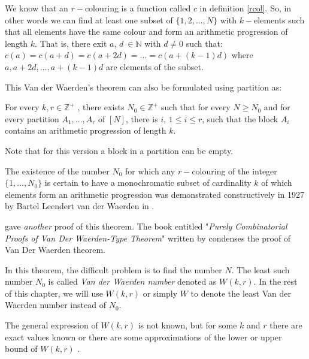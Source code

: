 
We know that an $r-$colouring is a function called $c$ in definition \eqref{rcol}. So, in other words we can find at least one subset of $\{1,2,\ldots,N\}$ with $k-$elements such that all elements have the same colour and form an arithmetic progression of length $k$. That is, there exit
$a$,  $d \ \in \mathbb{N}$ with $d\neq 0$ such that: $c(a)=c(a+d)=c(a+2d)=\ldots =c(a+(k-1)d)$ where $a, a+2d, \ldots, a+(k-1)d$ are elements of the subset.

This Van der Waerden's theorem can also be formulated using partition \citep{dransfield2004} as:

\begin{thm}
For every $k, r \in \mathbb{Z}^+$ , there exists $N_0 \in \mathbb{Z}^+$ such that for every $N \geq N_0$ and for every partition $A_1, \ldots , A_r$ of $[N]$, there is $i$, $1 \leq i \leq r$, such that the block $A_i$ contains an arithmetic progression of  length $k.$   \label{vd2}
\end{thm}

Note that for this version a block in a partition can be empty. 

The existence of the number $N_0$ for which any $r-$colouring of the integer $\{1, \ldots, N_0 \}$ is certain to have a monochromatic subset of cardinality $k$ of which elements form an arithmetic progression was demonstrated constructively in 1927 by Bartel Leendert van der Waerden in \cite{van1927beweis}.

\cite{graham1974short} gave \emph{another} proof of this theorem. The book entitled "\textit{Purely Combinatorial Proofs of Van Der Waerden-Type Theorem}" written by \cite{gasarch2010purely} condenses  the proof of Van Der Waerden theorem.

In this theorem, the difficult problem is to find the number $N$.
The least such number $N_0$ is called \textit{Van der Waerden number} denoted as $W(k,r).$ In the rest of this chapter, we will use $W(k,r)$ or simply $W$ to denote the least Van der Waerden number instead of $N_0.$

The general expression of $W(k,r)$ is not known, but for some $k$ and $r$ there are exact values known or there are some approximations of the  lower or upper bound of $W(k,r)$  \citep{dransfield2004}.

